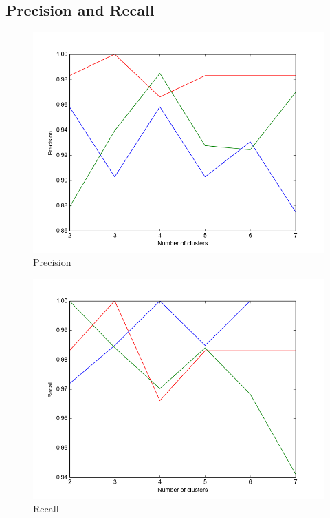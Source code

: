 \documentclass[11pt,a4paper]{article}
\begin{document}
\subsection{Precision and Recall}

\begin{minipage}[b]{0.5\textwidth}
\begin{figure}[H]
  \centering
  \includegraphics[width=.8\linewidth]{Figures/GMM_precisionvsk_BGR.png}
  \caption{Precision}
  \label{fig:sfig1}
\end{figure}%
\end{minipage}
\begin{minipage}[b]{0.5\textwidth}
\begin{figure}[H]
  \centering
  \includegraphics[width=.8\linewidth]{Figures/GMM_recallvsk_BGR.png}
\caption{Recall}
  \label{fig:sfig1}
\end{figure}%
\end{minipage}
\\
\end{document}
